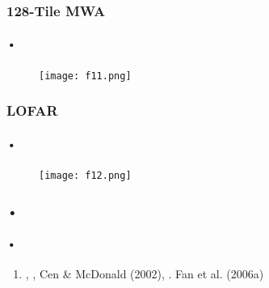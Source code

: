 \documentclass{beamer}
\begin{document}
\begin{frame}
\frametitle{128-Tile MWA}
\framesubtitle{•}
\begin{figure}[h]
  \centering
  \texttt{[image: f11.png]}
\end{figure}
\end{frame}

\begin{frame}
\frametitle{LOFAR}
\framesubtitle{•}
\begin{figure}[h]
  \centering
  \texttt{[image: f12.png]}
\end{figure}
\end{frame}

\begin{frame}[noframenumbering]
\frametitle{•}
\framesubtitle{•}
\begin{enumerate}[-]
\item \cite{Fan:2006dp}, \cite{Lidz:2001yc}, Cen \& McDonald (2002), \cite{Furlanetto:2004jz}.
 Fan et al. (2006a)
\end{enumerate}
\end{frame}


\end{document}
